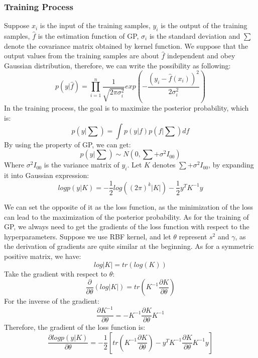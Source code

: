 \documentclass{article}
\begin{document}
 \subsubsection{Training Process}
Suppose $x_i$ is the input of the training samples, $y_i$ is the output of the training samples, $\hat{f}$ is the estimation function of GP, $\sigma_i$ is the standard deviation and $\sum$ denote the covariance matrix obtained by kernel function. We suppose that the output values from the training samples are about $\hat{f}$  independent and obey Gaussian distribution, therefore, we can write the possibility as following:
\begin{equation}
p({y}|\hat{f})=\prod_{i=1}^{n}\frac{1}{\sqrt{2\pi \sigma_i^2}}exp(-\frac{(y_i-\hat{f}(x_i))^2}{2\sigma_i^2})
\end{equation}
 In the training process, the goal is to maximize the posterior probability, which is:
 \begin{equation}
 p(y|\sum)=\int p(y|f)p(f|\sum)df
 \end{equation}
 By using the property of GP, we can get:
 \begin{equation}
 p({y|\sum})\sim N(0,\sum+\sigma^2I_{00})
 \end{equation}
 Where $\sigma^2I_{00}$ is the variance matrix of $y_i$. Let $K$ denotes $\sum+\sigma^2I_{00}$, by expanding it into Gaussian expression: 
 \begin{equation}\label{eq1}
 logp({y|K})=-\frac{1}{2}log((2\pi)^k|K|)-\frac{1}{2}y^T{K}^{-1}y
 \end{equation}
 
 We can set the opposite of it as the loss function, as the minimization of the loss can lead to the maximization of the posterior probability. As for the training of GP, we always need to get the gradients of the loss function with respect to the hyperparameters. Suppose we use RBF kernel, and let $\theta$ represent $s^2$ and $\gamma$, as the derivation of gradients are quite similar at the beginning. As for a symmetric positive matrix, we have:
 \begin{equation}
 log|K|=tr(log(K))
 \end{equation}
 Take the gradient with respect to $\theta$:
 \begin{equation}
 \frac{\partial}{\partial \theta}(log|K|)=tr(K^{-1}\frac{\partial K}{\partial \theta})
 \end{equation}
 For the inverse of the gradient:
 \begin{equation}
 \frac{\partial K^{-1}}{\partial \theta}=-K^{-1}\frac{\partial K}{\partial \theta}K^{-1}
 \end{equation}
 Therefore, the gradient of the loss function is:
 \begin{equation}\label{eq2}
 \frac{\partial logp({y|K})}{\partial \theta}=-\frac{1}{2}[tr(K^{-1}\frac{\partial K}{\partial \theta})-y^TK^{-1}\frac{\partial K}{\partial \theta}K^{-1}y]
 \end{equation}
 
\end{document}
